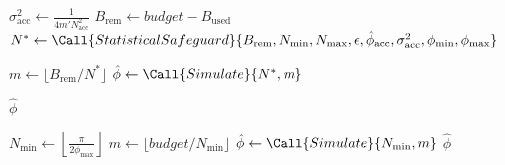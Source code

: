 \begin{algorithm}
\begin{algorithmic}

        \State
        \State $\sigma_\text{acc}^2 \gets \frac{1}{4m'N_\text{acc}^2}$
        \State $B_\text{rem} \gets \textit{budget} - B_\text{used}$
        \State $N^* \gets \Call{StatisticalSafeguard}{B_\text{rem}, N_\text{min}, N_\text{max}, \epsilon, \hat\phi_\text{acc}, \sigma_\text{acc}^2, \phi_\text{min}, \phi_\text{max}}$

        \State $m \gets \lfloor B_\text{rem} / N^*\rfloor$
        \State $\hat \phi \gets \Call{Simulate}{N^*, \textit{m}}$

        \State \Return $\hat\phi$

        \EndProcedure
    \end{algorithmic}
\end{algorithm}

\begin{algorithm}
    \caption{Estimate $\phi$ using ``Brute force''}
    \label{alg:brute-force}
    \begin{algorithmic}
        \State $N_\text{min} \gets \left\lfloor \frac {\pi} {2 \phi_\text{max}} \right\rfloor$
        \State $\textit{m} \gets \lfloor \textit{budget} / N_\text{min}\rfloor$
        \State $\hat \phi \gets \Call{Simulate}{N_\text{min}, m}$
        \State \Return $\hat\phi$
        \EndProcedure
    \end{algorithmic}
\end{algorithm}

